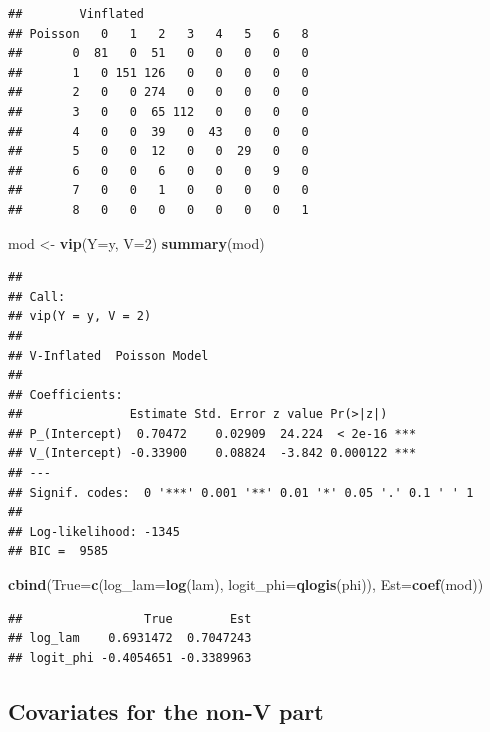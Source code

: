 \documentclass[]{article}
\newenvironment{Shaded}{\begin{snugshade}}{\end{snugshade}}
\newcommand{\KeywordTok}[1]{\textcolor[rgb]{0.13,0.29,0.53}{\textbf{#1}}}
\newcommand{\DataTypeTok}[1]{\textcolor[rgb]{0.13,0.29,0.53}{#1}}
\newcommand{\DecValTok}[1]{\textcolor[rgb]{0.00,0.00,0.81}{#1}}
\newcommand{\StringTok}[1]{\textcolor[rgb]{0.31,0.60,0.02}{#1}}
\newcommand{\NormalTok}[1]{#1}
\begin{document}
\begin{verbatim}
##        Vinflated
## Poisson   0   1   2   3   4   5   6   8
##       0  81   0  51   0   0   0   0   0
##       1   0 151 126   0   0   0   0   0
##       2   0   0 274   0   0   0   0   0
##       3   0   0  65 112   0   0   0   0
##       4   0   0  39   0  43   0   0   0
##       5   0   0  12   0   0  29   0   0
##       6   0   0   6   0   0   0   9   0
##       7   0   0   1   0   0   0   0   0
##       8   0   0   0   0   0   0   0   1
\end{verbatim}

\begin{Shaded}
\begin{Highlighting}[]
\NormalTok{mod <-}\StringTok{ }\KeywordTok{vip}\NormalTok{(}\DataTypeTok{Y=}\NormalTok{y, }\DataTypeTok{V=}\DecValTok{2}\NormalTok{)}
\KeywordTok{summary}\NormalTok{(mod)}
\end{Highlighting}
\end{Shaded}

\begin{verbatim}
## 
## Call:
## vip(Y = y, V = 2)
## 
## V-Inflated  Poisson Model
## 
## Coefficients:
##               Estimate Std. Error z value Pr(>|z|)    
## P_(Intercept)  0.70472    0.02909  24.224  < 2e-16 ***
## V_(Intercept) -0.33900    0.08824  -3.842 0.000122 ***
## ---
## Signif. codes:  0 '***' 0.001 '**' 0.01 '*' 0.05 '.' 0.1 ' ' 1 
## 
## Log-likelihood: -1345 
## BIC =  9585
\end{verbatim}

\begin{Shaded}
\begin{Highlighting}[]
\KeywordTok{cbind}\NormalTok{(}\DataTypeTok{True=}\KeywordTok{c}\NormalTok{(}\DataTypeTok{log_lam=}\KeywordTok{log}\NormalTok{(lam), }\DataTypeTok{logit_phi=}\KeywordTok{qlogis}\NormalTok{(phi)),}
      \DataTypeTok{Est=}\KeywordTok{coef}\NormalTok{(mod))}
\end{Highlighting}
\end{Shaded}

\begin{verbatim}
##                 True        Est
## log_lam    0.6931472  0.7047243
## logit_phi -0.4054651 -0.3389963
\end{verbatim}

\subsection{Covariates for the non-V
part}\label{covariates-for-the-non-v-part}
\end{document}
